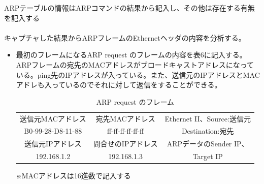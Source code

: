 \documentclass[10pt]{article}
\begin{document}
\begin{enumerate}
\begin{table}[H]
\begin{tabular}{|c|c|c|c|}
            	\end{tabular}
            \end{table} 
        \endgroup
        \text{*}ARPテーブルの情報はARPコマンドの結果から記入し、その他は存在する有無を記入する\\\\
        キャプチャした結果からARPフレームのEthernetヘッダの内容を分析する。
        \begin{itemize}
            \item 最初のフレームになるARP request のフレームの内容を表6に記入する。\\
            ARPフレームの宛先のMACアドレスがブロードキャストアドレスになっている。ping先のIPアドレスが入っている。また、送信元のIPアドレスとMACアドレも入っているのでそれに対して返信をすることができる。
            
                \begingroup
                \setlength{\tabcolsep}{5pt} %
                \renewcommand{\arraystretch}{1.5} %
                \begin{table}[H]
                \centering
            	\caption{ARP request のフレーム}
            	\begin{tabular}{|c|c|c|} 
                	\hline
                	    送信元MACアドレス &  宛先MACアドレス  & Ethernet II、Source:送信元\\
                	     B0-99-28-D8-11-88 &  ff-ff-ff-ff-ff-ff & Destination:宛先\\ [0.5ex] 
                	\hline
                	    送信元IPアドレス &  問合せのIPアドレス  & ARPデータのSender IP、\\
                	     192.168.1.2 & 192.168.1.3  & Target IP\\ [0.5ex] 
                	\hline
                \end{tabular}
                \end{table} 
                \endgroup
                \text{*}※MACアドレスは16進数で記入する\\
            

\end{itemize}
\end{enumerate}
\end{document}
